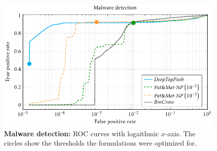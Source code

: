 \begin{figure}
  \centering
  \includegraphics{images/malware_detection.pdf}
  \caption{\textbf{Malware detection:} ROC curves with logaithmic $x$-axis. The circles show the thresholds the formulations were optimized for.}
  \label{fig: malware detection}
\end{figure}
